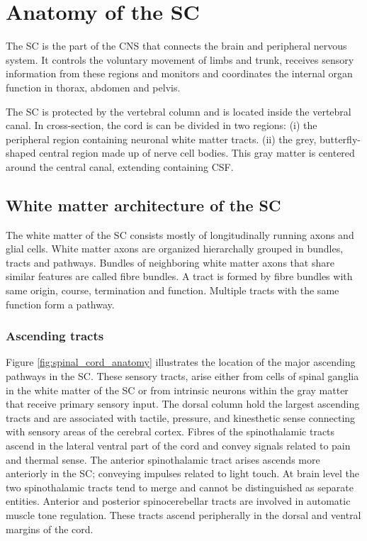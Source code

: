 \newcommand{\prot}{\ensuremath{\mathcal{P}}}

\section{Anatomy of the {\protect\acrlong{SC}}}
The {\gls{SC}} is the part of the {\gls{CNS}} that connects the brain and peripheral nervous system. It controls the voluntary movement of limbs and trunk, receives sensory information from these regions and monitors and coordinates the internal organ function in thorax, abdomen and pelvis. 

The {\gls{SC}} is protected by the vertebral column and is located inside the vertebral canal. In cross-section, the cord is can be divided in two regions: (i) the peripheral region containing neuronal white matter tracts. (ii) the grey, butterfly-shaped central region made up of nerve cell bodies. This gray matter is centered around the central canal, extending containing \gls{CSF}.

\subsection*{White matter architecture of the {\protect\acrlong{SC}}}
The white matter of the {\gls{SC}} consists mostly of longitudinally running axons and glial cells. White matter axons are organized hierarchally grouped in bundles, tracts and pathways. Bundles of neighboring white matter axons that share similar features are called fibre bundles. A tract is formed by fibre bundles with same origin, course, termination and function. Multiple tracts with the same function form a pathway.

\subsubsection*{Ascending tracts}
\label{sec:chap2:ascendingtracts}
Figure \ref{fig:spinal_cord_anatomy} illustrates the location of the major ascending pathways in the {\gls{SC}}. These sensory tracts, arise either from cells of spinal ganglia in the white matter of the {\gls{SC}} or from intrinsic neurons within the gray matter that receive primary sensory input. The dorsal column hold the largest ascending tracts and are associated with tactile, pressure, and kinesthetic sense connecting with sensory areas of the cerebral cortex. Fibres of the spinothalamic tracts ascend in the lateral ventral part of the cord and convey signals related to pain and thermal sense. The anterior spinothalamic tract arises ascends more anteriorly in the {\gls{SC}}; conveying impulses related to light touch. At brain level the two spinothalamic tracts tend to merge and cannot be distinguished as separate entities. Anterior and posterior spinocerebellar tracts are involved in automatic muscle tone regulation. These tracts ascend peripherally in the dorsal and ventral margins of the cord.

